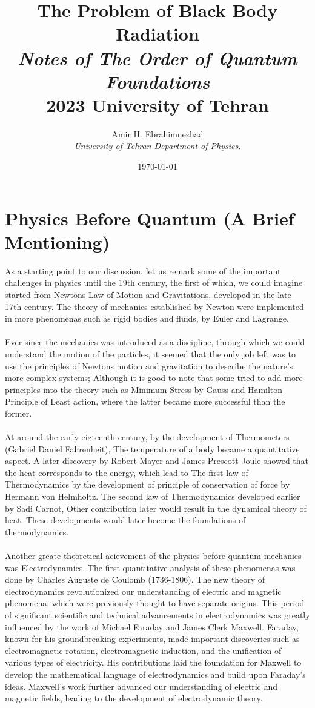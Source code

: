\documentclass[9pt,a4paper, twocolumn]{article}
\title{The Problem of Black Body Radiation \\ \large \textit{Notes of The Order of Quantum Foundations} \\ 2023 University of Tehran}
\date{\today}
\author{Amir H. Ebrahimnezhad \\ \small \textit{University of Tehran Department of Physics.}}
\newcounter{theo}
\begin{document}
    \maketitle
    \tableofcontents
    \section{Physics Before Quantum (A Brief Mentioning)}
        As a starting point to our discussion, let us remark some of the important challenges in physics until the 19th century, the first of which, we could imagine started from Newtons Law of Motion and Gravitations, developed in the late 17th century. The theory of mechanics established by Newton were implemented in more phenomenas such as rigid bodies and fluids, by Euler and Lagrange.
        \\
        \\
        Ever since the mechanics was introduced as a discipline, through which we could understand the motion of the particles, it seemed that the only job left was to use the principles of Newtons motion and gravitation to describe the nature's more complex systems; Although it is good to note that some tried to add more principles into the theory such as Minimum Stress by Gauss and Hamilton Principle of Least action, where the latter became more successful than the former.
        \\
        \\
        At around the early eigteenth century, by the development of Thermometers (Gabriel Daniel Fahrenheit), The temperature of a body became a quantitative aspect. A later discovery by Robert Mayer and James Prescott Joule showed that the heat corresponds to the energy, which lead to The first law of Thermodynamics by the development of principle of conservation of force by Hermann von Helmholtz. The second law of Thermodynamics developed earlier by Sadi Carnot, Other contribution later would result in the dynamical theory of heat. These developments would later become the foundations of thermodynamics.
        \\
        \\
        Another greate theoretical acievement of the physics before quantum mechanics was Electrodynamics. The first quantitative analysis of these phenomenas was done by Charles Auguste de Coulomb (1736-1806). The new theory of electrodynamics revolutionized our understanding of electric and magnetic phenomena, which were previously thought to have separate origins. This period of significant scientific and technical advancements in electrodynamics was greatly influenced by the work of Michael Faraday and James Clerk Maxwell. Faraday, known for his groundbreaking experiments, made important discoveries such as electromagnetic rotation, electromagnetic induction, and the unification of various types of electricity. His contributions laid the foundation for Maxwell to develop the mathematical language of electrodynamics and build upon Faraday's ideas. Maxwell's work further advanced our understanding of electric and magnetic fields, leading to the development of electrodynamic theory.
\end{document}
